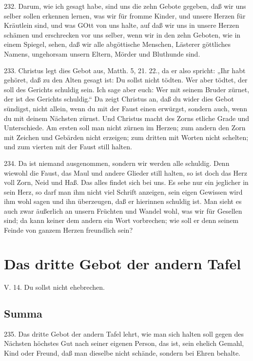 232. Darum, wie ich gesagt habe, sind uns die zehn Gebote gegeben, daß wir uns selber sollen erkennen lernen, was wir für fromme Kinder, und unsere Herzen für Kräutlein sind, und was GOtt von uns halte, auf daß wir uns in unsere Herzen schämen und erschrecken vor uns selber, wenn wir in den zehn Geboten, wie in einem Spiegel, sehen, daß wir alle abgöttische Menschen, Lästerer göttliches Namens, ungehorsam unsern Eltern, Mörder und Bluthunde sind.

233. Christus legt dies Gebot aus, Matth. 5, 21. 22., da er also spricht: „Ihr habt gehöret, daß zu den Alten gesagt ist: Du sollst nicht tödten. Wer aber tödtet, der soll des Gerichts schuldig sein. Ich sage aber euch: Wer mit seinem Bruder zürnet, der ist des Gerichts schuldig.“ Da zeigt Christus an, daß du wider dies Gebot sündigst, nicht allein, wenn du mit der Faust einen erwürgst, sondern auch, wenn du mit deinem Nächsten zürnst. Und Christus macht des Zorns etliche Grade und Unterschiede. Am ersten soll man nicht zürnen im Herzen; zum andern den Zorn mit Zeichen und Gebärden nicht erzeigen; zum dritten mit Worten nicht schelten; und zum vierten mit der Faust still halten.

234. Da ist niemand ausgenommen, sondern wir werden alle schuldig. Denn wiewohl die Faust, das Maul und andere Glieder still halten, so ist doch das Herz voll Zorn, Neid und Haß. Das alles findet sich bei uns. Es sehe nur ein jeglicher in sein Herz, so darf man ihm nicht viel Schrift anzeigen, sein eigen Gewissen wird ihm wohl sagen und ihn überzeugen, daß er hierinnen schuldig ist. Man sieht es auch zwar äußerlich an unsern Früchten und Wandel wohl, was wir für Gesellen sind; da kann keiner dem andern ein Wort vorbrechen; wie soll er denn seinem Feinde von ganzem Herzen freundlich sein?

\section{Das dritte Gebot der andern Tafel}

\begin{schriftzitat}
V. 14. Du sollst nicht ehebrechen.
\end{schriftzitat}

\subsection{Summa}

235. Das dritte Gebot der andern Tafel lehrt, wie man sich halten soll gegen des Nächsten höchstes Gut nach seiner eigenen Person, das ist, sein ehelich Gemahl, Kind oder Freund, daß man dieselbe nicht schände, sondern bei Ehren behalte.

